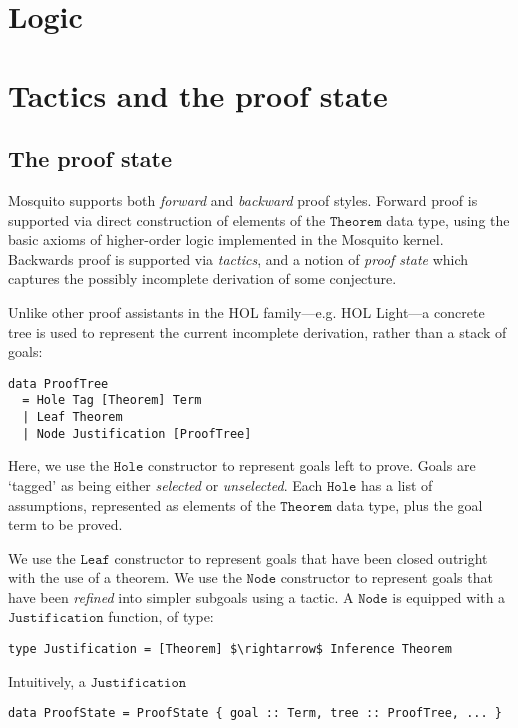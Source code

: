 \documentclass{llncs}
\newcommand{\mosquito}{Mosquito\xspace}
\begin{document}
\section{Logic}
\label{sect.logic}

\section{Tactics and the proof state}
\label{sect.tactics.proof.state}

\subsection{The proof state}
\label{subsect.proof.state}

\mosquito supports both \emph{forward} and \emph{backward} proof styles.
Forward proof is supported via direct construction of elements of the $\mathtt{Theorem}$ data type, using the basic axioms of higher-order logic implemented in the \mosquito kernel.
Backwards proof is supported via \emph{tactics}, and a notion of \emph{proof state} which captures the possibly incomplete derivation of some conjecture.

Unlike other proof assistants in the HOL family---e.g. HOL Light---a concrete tree is used to represent the current incomplete derivation, rather than a stack of goals:
\begin{lstlisting}
data ProofTree
  = Hole Tag [Theorem] Term
  | Leaf Theorem
  | Node Justification [ProofTree]
\end{lstlisting}
Here, we use the $\mathtt{Hole}$ constructor to represent goals left to prove.
Goals are `tagged' as being either \emph{selected} or \emph{unselected}.
Each $\mathtt{Hole}$ has a list of assumptions, represented as elements of the $\mathtt{Theorem}$ data type, plus the goal term to be proved.

We use the $\mathtt{Leaf}$ constructor to represent goals that have been closed outright with the use of a theorem.
We use the $\mathtt{Node}$ constructor to represent goals that have been \emph{refined} into simpler subgoals using a tactic.
A $\mathtt{Node}$ is equipped with a $\mathtt{Justification}$ function, of type:
\begin{lstlisting}
type Justification = [Theorem] $\rightarrow$ Inference Theorem
\end{lstlisting}
Intuitively, a $\mathtt{Justification}$

\begin{lstlisting}
data ProofState = ProofState { goal :: Term, tree :: ProofTree, ... }
\end{lstlisting}
\end{document}
